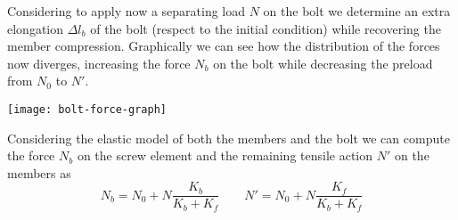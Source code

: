\begin{multicols}{2}
	Considering to apply now a separating load $N$ on the bolt we determine an extra elongation $\Delta l_b$ of the bolt (respect to the initial condition) while recovering the member compression. Graphically we can see how the distribution of the forces now diverges, increasing the force $N_b$ on the bolt while decreasing the preload from $N_0$ to $N'$.	
	\begin{center}
		\texttt{[image: bolt-force-graph]}
	\end{center}
	Considering the elastic model of both the members and the bolt we can compute the force $N_b$ on the screw element and the remaining tensile action $N'$ on the members as
	\[ N_b = N_0 + N \frac{K_b}{K_b+K_f} \qquad N' = N_0 + N \frac{K_f}{K_b+K_f} \]
	
	
	
	
	
	
	
	
	
	
	
	
	
	
	
	
	
	
	
	
	
	
	
	
	
	
	
	
	
	
	
	
	
	
	
	
	
\end{multicols}